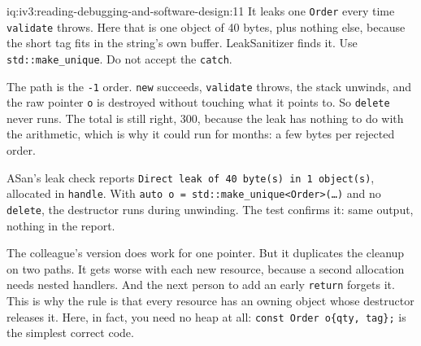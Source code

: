 \begin{solution}{iq:iv3:reading-debugging-and-software-design:11}
It leaks one \texttt{Order} every time \texttt{validate} throws. Here that is one object of 40 bytes, plus nothing else, because the short tag fits in the string's own buffer. LeakSanitizer finds it. Use \texttt{std::make\_unique}. Do not accept the \texttt{catch}.

The path is the \texttt{-1} order. \texttt{new} succeeds, \texttt{validate} throws, the stack unwinds, and the raw pointer \texttt{o} is destroyed without touching what it points to. So \texttt{delete} never runs. The total is still right, 300, because the leak has nothing to do with the arithmetic, which is why it could run for months: a few bytes per rejected order.

ASan's leak check reports \texttt{Direct leak of 40 byte(s) in 1 object(s)}, allocated in \texttt{handle}. With \texttt{auto o = std::make\_unique<Order>(\dots)} and no \texttt{delete}, the destructor runs during unwinding. The test confirms it: same output, nothing in the report.

The colleague's version does work for one pointer. But it duplicates the cleanup on two paths. It gets worse with each new resource, because a second allocation needs nested handlers. And the next person to add an early \texttt{return} forgets it. This is why the rule is that every resource has an owning object whose destructor releases it. Here, in fact, you need no heap at all: \texttt{const Order o\{qty, \textquotedbl{}tag\textquotedbl{}\};} is the simplest correct code.


\end{solution}

